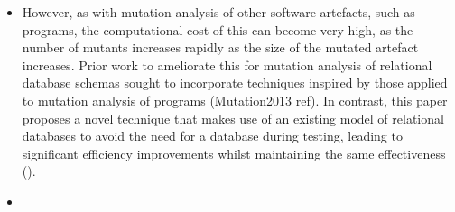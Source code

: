 \begin{itemize}
		\item However, as with mutation analysis of other software artefacts, such as programs, the computational cost of this can become very high, as the number of mutants increases rapidly as the size of the mutated artefact increases. Prior work to ameliorate this for mutation analysis of relational database schemas sought to incorporate techniques inspired by those applied to mutation analysis of programs (Mutation2013 ref). In contrast, this paper proposes a novel technique that makes use of an existing model of relational databases to avoid the need for a database during testing, leading to significant efficiency improvements whilst maintaining the same effectiveness ().

		\item {}

	\end{itemize}